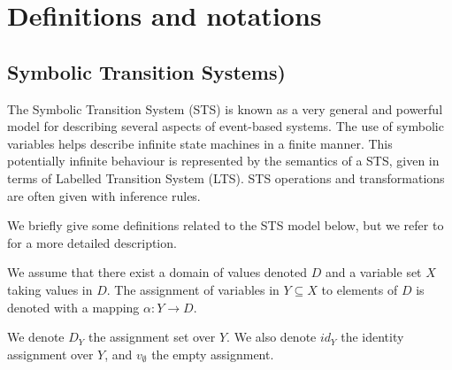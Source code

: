 %
\chapter{Definitions and notations}
\label{sec:definitions}


\section{Symbolic Transition Systems)}
\label{sec:definitions:sts}

The Symbolic Transition System (STS) is known as a very general
and powerful model for describing several aspects of event-based
systems. The use of symbolic variables helps describe infinite
state machines in a finite manner. This potentially infinite
behaviour is represented by the semantics of a STS, given in
terms of Labelled Transition System (LTS). STS operations and
transformations are often given with inference rules.

We briefly give some definitions related to the STS model below,
but we refer to \cite{FTW05} for a more detailed description.

\begin{definition}
We assume that there exist a domain of values denoted $D$ and a
variable set $X$ taking values in $D$. The assignment of
variables in $Y \subseteq X$ to elements of $D$ is denoted with a
mapping  $\alpha: Y \rightarrow D$.

We denote $D_Y$ the assignment set over $Y$. We also denote
$id_Y$ the identity assignment over $Y$, and $v_\emptyset$ the
empty assignment.
\end{definition}

